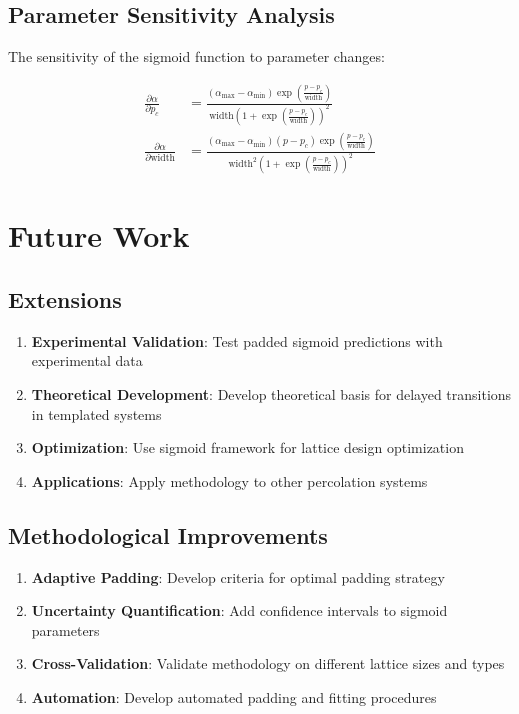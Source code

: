 \documentclass[11pt]{article}
\begin{document}
\subsection{Parameter Sensitivity Analysis}

The sensitivity of the sigmoid function to parameter changes:

\begin{align}
    \frac{\partial \alpha}{\partial p_c} &= \frac{(\alpha_{\max} - \alpha_{\min}) \exp\left(\frac{p - p_c}{\text{width}}\right)}{\text{width} \left(1 + \exp\left(\frac{p - p_c}{\text{width}}\right)\right)^2} \\
    \frac{\partial \alpha}{\partial \text{width}} &= \frac{(\alpha_{\max} - \alpha_{\min})(p - p_c) \exp\left(\frac{p - p_c}{\text{width}}\right)}{\text{width}^2 \left(1 + \exp\left(\frac{p - p_c}{\text{width}}\right)\right)^2}
\end{align}

\section{Future Work}

\subsection{Extensions}

\begin{enumerate}
    \item \textbf{Experimental Validation}: Test padded sigmoid predictions with experimental data
    \item \textbf{Theoretical Development}: Develop theoretical basis for delayed transitions in templated systems
    \item \textbf{Optimization}: Use sigmoid framework for lattice design optimization
    \item \textbf{Applications}: Apply methodology to other percolation systems
\end{enumerate}

\subsection{Methodological Improvements}

\begin{enumerate}
    \item \textbf{Adaptive Padding}: Develop criteria for optimal padding strategy
    \item \textbf{Uncertainty Quantification}: Add confidence intervals to sigmoid parameters
    \item \textbf{Cross-Validation}: Validate methodology on different lattice sizes and types
    \item \textbf{Automation}: Develop automated padding and fitting procedures
\end{enumerate}
\end{document}
